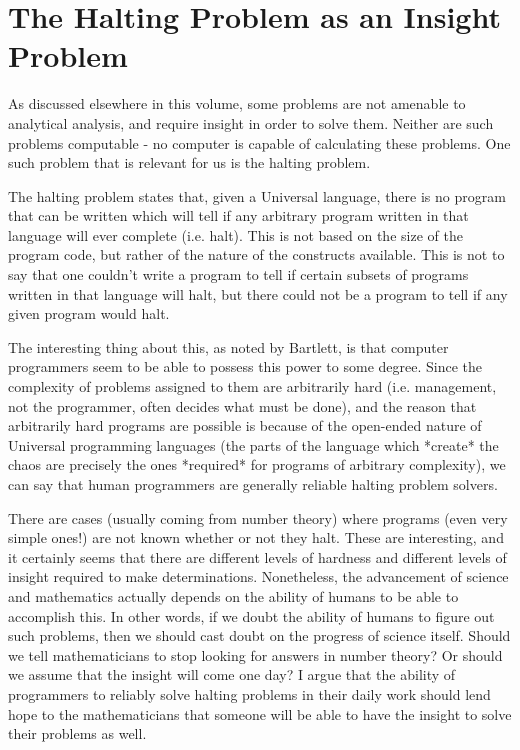 \section{The Halting Problem as an Insight Problem}

As discussed elsewhere in this volume, some problems are not amenable to analytical analysis, and require insight in order to solve them.\cite{bartlett1}\cite{holloway}  Neither are such problems computable - no computer is capable of calculating these problems.  One such problem that is relevant for us is the halting problem.

The halting problem states that, given a Universal language, there is no program that can be written which will tell if any arbitrary program written in that language will ever complete (i.e. halt).  This is not based on the size of the program code, but rather of the nature of the constructs available.  This is not to say that one couldn’t write a program to tell if certain subsets of programs written in that language will halt, but there could not be a program to tell if any given program would halt.

The interesting thing about this, as noted by Bartlett\cite{bartlett1}, is that computer programmers seem to be able to possess this power to some degree.  Since the complexity of problems assigned to them are arbitrarily hard (i.e. management, not the programmer, often decides what must be done), and the reason that arbitrarily hard programs are possible is because of the open-ended nature of Universal programming languages (the parts of the language which *create* the chaos are precisely the ones *required* for programs of arbitrary complexity), we can say that human programmers are generally reliable halting problem solvers.

There are cases (usually coming from number theory) where programs (even very simple ones!) are not known whether or not they halt.  These are interesting, and it certainly seems that there are different levels of hardness and different levels of insight required to make determinations.  Nonetheless, the advancement of science and mathematics actually depends on the ability of humans to be able to accomplish this.  In other words, if we doubt the ability of humans to figure out such problems, then we should cast doubt on the progress of science itself.  Should we tell mathematicians to stop looking for answers in number theory?   Or should we assume that the insight will come one day?  I argue that the ability of programmers to reliably solve halting problems in their daily work should lend hope to the mathematicians that someone will be able to have the insight to solve their problems as well.

